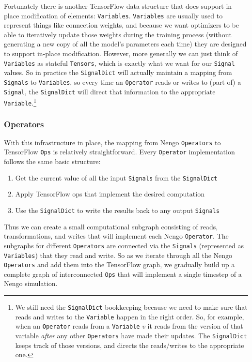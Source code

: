 \documentclass{article}
\begin{document}
Fortunately there is another TensorFlow data structure that does support in-place modification of elements: \texttt{Variables}.  \texttt{Variables} are usually used to represent things like connection weights, and because we want optimizers to be able to iteratively update those weights during the training process (without generating a new copy of all the model's parameters each time) they are designed to support in-place modification.  However, more generally we can just think of \texttt{Variables} as stateful \texttt{Tensors}, which is exactly what we want for our \texttt{Signal} values.  So in practice the \texttt{SignalDict} will actually maintain a mapping from \texttt{Signals} to \texttt{Variables}, so every time an \texttt{Operator} reads or writes to (part of) a \texttt{Signal}, the \texttt{SignalDict} will direct that information to the appropriate \texttt{Variable}.\footnote{We still need the \texttt{SignalDict} bookkeeping because we need to make sure that reads and writes to the \texttt{Variable} happen in the right order.  So, for example, when an \texttt{Operator} reads from a \texttt{Variable} $v$ it reads from the version of that variable \emph{after} any other \texttt{Operators} have made their updates.  The \texttt{SignalDict} keeps track of those versions, and directs the reads/writes to the appropriate one.}

\subsubsection{Operators}

With this infrastructure in place, the mapping from Nengo \texttt{Operators} to TensorFlow \texttt{Ops} is relatively straightforward.  Every \texttt{Operator} implementation follows the same basic structure:

\begin{enumerate}
\item Get the current value of all the input \texttt{Signals} from the \texttt{SignalDict}
\item Apply TensorFlow ops that implement the desired computation
\item Use the \texttt{SignalDict} to write the results back to any output \texttt{Signals}
\end{enumerate}

Thus we can create a small computational subgraph consisting of reads, transformations, and writes that will implement each Nengo \texttt{Operator}.  The subgraphs for different \texttt{Operators} are connected via the \texttt{Signals} (represented as \texttt{Variables}) that they read and write.  So as we iterate through all the Nengo \texttt{Operators} and add them into the TensorFlow graph, we gradually build up a complete graph of interconnected \texttt{Ops} that will implement a single timestep of a Nengo simulation.
\end{document}
